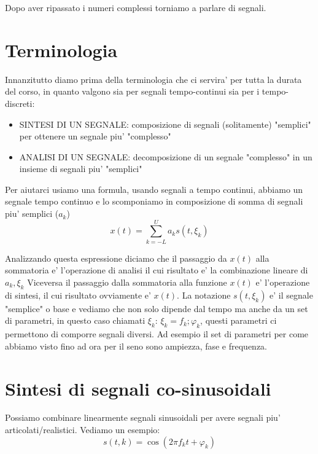 Dopo aver ripassato i numeri complessi torniamo a parlare di segnali.
\section{Terminologia}
Innanzitutto diamo prima della terminologia che ci servira' per tutta la durata del corso, in quanto valgono sia per segnali tempo-continui sia per i tempo-discreti:
\begin{itemize}
    \item SINTESI DI UN SEGNALE: composizione di segnali (solitamente) "semplici" per ottenere un segnale piu' "complesso"
    \item ANALISI DI UN SEGNALE: decomposizione di un segnale "complesso" in un insieme di segnali piu' "semplici"
\end{itemize}

Per aiutarci usiamo una formula, usando segnali a tempo continui, abbiamo un segnale tempo continuo e lo scomponiamo in composizione di somma di segnali piu' semplici ($a_k$)
\begin{equation}
    x(t) = \sum_{k = -L}^{U} a_k s(t, \xi _k)
\end{equation}

Analizzando questa espressione diciamo che il passaggio da $x(t)$ alla sommatoria e' l'operazione di analisi il cui risultato e' la combinazione lineare di $a_k, \xi_k$
Viceversa il passaggio dalla sommatoria alla funzione $x(t)$ e' l'operazione di sintesi, il cui risultato ovviamente e' $x(t)$.
La notazione $s(t, \xi_k)$ e' il segnale "semplice" o base e vediamo che non solo dipende dal tempo ma anche da un set di parametri, in questo caso chiamati $\xi_k$: $\xi_k = {f_k; \varphi_k}$, questi parametri ci permettono di comporre segnali diversi. Ad esempio il set di parametri per come abbiamo visto fino ad ora per il seno sono ampiezza, fase e frequenza.

\section{Sintesi di segnali co-sinusoidali}
Possiamo combinare linearmente segnali sinusoidali per avere segnali piu' articolati/realistici.
Vediamo un esempio:
\begin{equation}
    s(t, k) = \cos (2\pi f_k t + \varphi_k)
\end{equation}

